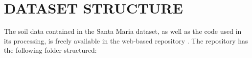 
\section{DATASET STRUCTURE}

The soil data contained in the Santa Maria dataset, as well as the code used in its processing, is freely 
available in the web-based \git{} repository \github{}. The repository has the following folder structured:

